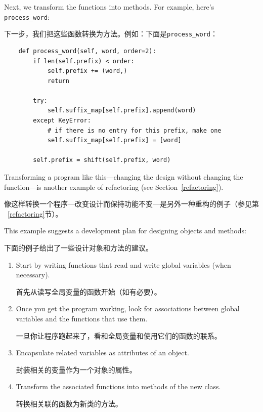 \documentclass[10pt]{book}
\begin{document}
\begin{CJK}{UTF8}{gbsn}
Next, we transform the functions into methods.  For example,
here's \verb"process_word":

下一步，我们把这些函数转换为方法。例如：下面是\verb"process_word"：

\begin{verbatim}
    def process_word(self, word, order=2):
        if len(self.prefix) < order:
            self.prefix += (word,)
            return

        try:
            self.suffix_map[self.prefix].append(word)
        except KeyError:
            # if there is no entry for this prefix, make one
            self.suffix_map[self.prefix] = [word]

        self.prefix = shift(self.prefix, word)        
\end{verbatim}

Transforming a program like this---changing the design without
changing the function---is another example of refactoring
(see Section~\ref{refactoring}).

像这样转换一个程序---改变设计而保持功能不变---是另外一种重构的例子（参见第
~\ref{refactoring}节）。

This example suggests a development plan for designing objects and
methods:

下面的例子给出了一些设计对象和方法的建议。

\begin{enumerate}

\item Start by writing functions that read and write global
variables (when necessary).

首先从读写全局变量的函数开始（如有必要）。

\item Once you get the program working, look for associations
between global variables and the functions that use them.

一旦你让程序跑起来了，看和全局变量和使用它们的函数的联系。

\item Encapsulate related variables as attributes of an object.

封装相关的变量作为一个对象的属性。

\item Transform the associated functions into methods of the new
class.

转换相关联的函数为新类的方法。

\end{enumerate}



\end{CJK}
\end{document}
